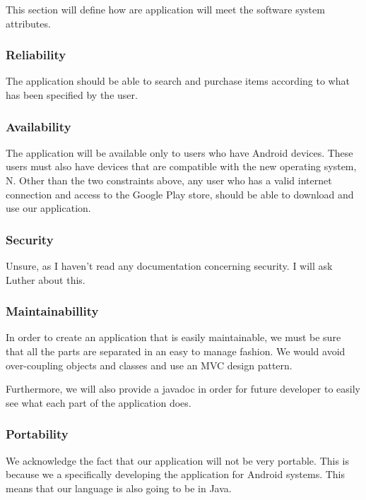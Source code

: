 \documentclass[journal,compsoc, 10pt, draftclsnofoot, onecolumn]{IEEEtran}
\begin{document}
This section will define how are application will meet the software system 
attributes.

\subsubsection{Reliability}

The application should be able to search and purchase items according to what 
has been specified by the user.

\subsubsection{Availability}

The application will be available only to users who have Android devices. These 
users must also have devices that are compatible with the new operating system, 
N. Other than the two constraints above, any user who has a valid internet 
connection and access to the Google Play store, should be able to download and 
use our application.

\subsubsection{Security}

Unsure, as I haven't read any documentation concerning security. I will ask Luther about this. 

\subsubsection{Maintainabillity}

In order to create an application that is easily maintainable, we must be sure 
that all the parts are separated in an easy to manage fashion. We would avoid 
over-coupling objects and classes and use an MVC design pattern. \newline

Furthermore, we will also provide a javadoc in order for future developer to 
easily see what each part of the application does.

\subsubsection{Portability}

We acknowledge the fact that our application will not be very portable. This is 
because we a specifically developing the application for Android systems. This 
means that our language is also going to be in Java. 
\end{document}
